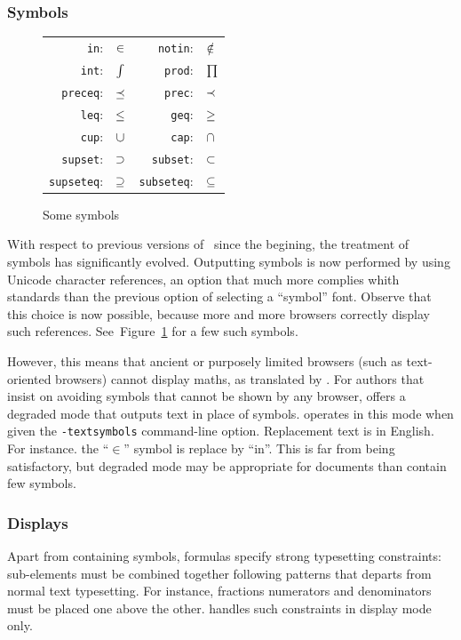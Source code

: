 \subsubsection{Symbols}\label{symbols}
\begin{figure}[ht]
\caption{\label{symbol:fig}Some symbols}
\def\zyva#1{\texttt{\char92{}#1}:\quad & \Large $\csname#1\endcsname$}
\begin{center}
\begin{tabular}{rl@{\qquad}rl}
\zyva{in} & \zyva{notin}\\
\zyva{int} & \zyva{prod}\\
\zyva{preceq} & \zyva{prec}\\
\zyva{leq}    & \zyva{geq}\\
\zyva{cup} & \zyva{cap}\\
\zyva{supset} & \zyva{subset}\\
\zyva{supseteq} & \zyva{subseteq}\\
\end{tabular}
\end{center}
\end{figure}
With respect to previous versions of~\hevea{} since the begining, the
treatment of symbols has significantly evolved.  Outputting symbols is
now performed by using Unicode character references, an option that
much more complies whith standards than the previous option of
selecting a ``symbol'' font.  Observe that this choice is now
possible, because more and more browsers correctly display such
references. See~Figure~\ref{symbol:fig} for a few such symbols.



However, this means that ancient or purposely limited browsers (such as
text-oriented browsers) cannot display maths, as translated by \hevea.
For authors that insist on avoiding symbols that cannot be shown
by any browser, \hevea{} offers a degraded mode that outputs text
in place of symbols.
\hevea{} operates in this mode when given the \texttt{-textsymbols}
command-line option. Replacement text is in English.
For instance. the ``$\in$'' symbol is replace by ``in''.
This is far from being satisfactory, but degraded mode may be
appropriate for documents than contain few symbols.


\subsubsection{Displays}
Apart from containing symbols, formulas specify strong typesetting
constraints: sub-elements must be combined together following patterns
that departs from normal text typesetting. For instance, fractions
numerators and denominators must be placed one above the other.
\hevea{} handles such constraints in display mode only.



